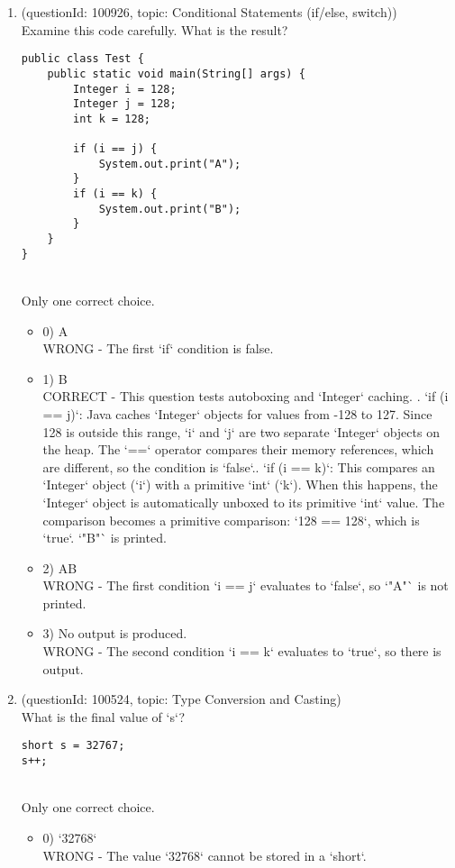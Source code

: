 \documentclass[12pt]{article}
\begin{document}
\begin{enumerate}[label=(\arabic*)]
\begin{itemize}
\end{itemize}
\item (questionId: 100926, topic: Conditional Statements (if/else, switch)) \\ 
Examine this code carefully. What is the result?\n\begin{verbatim}
public class Test {
    public static void main(String[] args) {
        Integer i = 128;
        Integer j = 128;
        int k = 128;

        if (i == j) {
            System.out.print("A");
        }
        if (i == k) {
            System.out.print("B");
        }
    }
}
\end{verbatim}
\\ \noindent Only one correct choice. 
\begin{itemize}
\item 0) A
 \\ 
WRONG - The first `if` condition is false.

\item 1) B
 \\ 
CORRECT - This question tests autoboxing and `Integer` caching. . `if (i == j)`: Java caches `Integer` objects for values from -128 to 127. Since 128 is outside this range, `i` and `j` are two separate `Integer` objects on the heap. The `==` operator compares their memory references, which are different, so the condition is `false`.. `if (i == k)`: This compares an `Integer` object (`i`) with a primitive `int` (`k`). When this happens, the `Integer` object is automatically unboxed to its primitive `int` value. The comparison becomes a primitive comparison: `128 == 128`, which is `true`. `"B"` is printed.

\item 2) AB
 \\ 
WRONG - The first condition `i == j` evaluates to `false`, so `"A"` is not printed.

\item 3) No output is produced.
 \\ 
WRONG - The second condition `i == k` evaluates to `true`, so there is output.

\end{itemize}
\item (questionId: 100524, topic: Type Conversion and Casting) \\ 
What is the final value of `s`?
\begin{verbatim}
short s = 32767;
s++;
\end{verbatim}
\\ \noindent Only one correct choice. 
\begin{itemize}
\item 0) `32768`
 \\ 
WRONG - The value `32768` cannot be stored in a `short`.


\end{itemize}
\end{enumerate}
\end{document}
